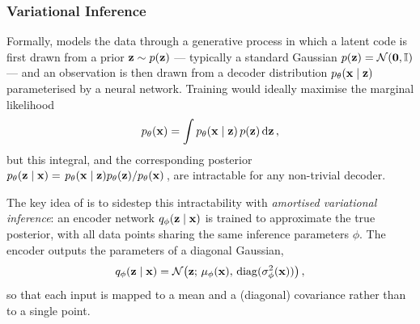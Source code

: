 \subsubsection{Variational Inference} \label{sec:background:ae:vae:inference}
Formally,  models the data through a generative process in which a
latent code is first drawn from a prior $\vb{z} \sim p(\vb{z})$ --- typically a
standard Gaussian $p(\vb{z}) = \mathcal{N}(\vb{0}, \mathbb{I})$ --- and an
observation is then drawn from a decoder distribution $p_{\theta}(\vb{x}
\mid \vb{z})$ parameterised by a neural network. Training would ideally
maximise the marginal likelihood
\begin{equation*}
    p_{\theta}(\vb{x}) = \int p_{\theta}(\vb{x} \mid \vb{z}) \, p(\vb{z})
    \dd{\vb{z}},
\end{equation*}
but this integral, and the corresponding posterior $p_{\theta}(\vb{z} \mid
\vb{x}) = \flatfrac{p_{\theta}(\vb{x} \mid \vb{z})
p_{\theta}(\vb{z})}{p_{\theta}(\vb{x})}$, are intractable for any non-trivial
decoder.

The key idea of \citet{kingmaAutoencodingVariationalBayes2014} is to sidestep
this intractability with \textit{amortised variational inference}: an encoder
network $q_{\phi}(\vb{z} \mid \vb{x})$ is trained to approximate the
true posterior, with all data points sharing the same inference parameters
$\phi$. The encoder outputs the parameters of a diagonal Gaussian,
\begin{equation} \label{eq:background:ae:vae:posterior}
    q_{\phi}(\vb{z} \mid \vb{x}) = \mathcal{N}\!\left(\vb{z};\,
    \vb{\mu}_{\phi}(\vb{x}),\,
    \operatorname{diag}(\vb{\sigma}^{2}_{\phi}(\vb{x}))\right),
\end{equation}
so that each input is mapped to a mean and a (diagonal) covariance rather than
to a single point.

